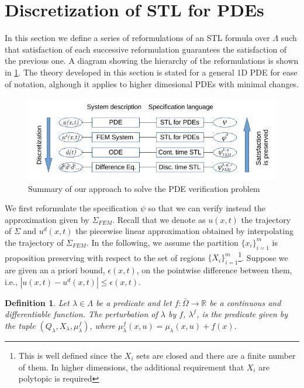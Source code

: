 \documentclass[letterpaper, 10 pt, conference]{ieeeconf/ieeeconf}
\newtheorem{definition}{Definition}
\newcommand*{\R}{\mathbb{R}}
\begin{document}
\section{Discretization of STL for PDEs}
\label{sec:formally_correct_discretization_of_pdestl}

In this section we define a series of reformulations of an STL formula over
$\Lambda$ such that satisfaction of each successive reformulation guarantees the
satisfaction of the previous one. A diagram showing the hierarchy of the
reformulations is shown in \cref{fig:diagram}. The theory developed in this section is stated
for a general 1D PDE for ease of notation, alghough it applies to higher dimesional PDEs
with minimal changes.

\begin{figure}[!t]
    \centering 
    \includegraphics[width=0.99\columnwidth]{diagram.png}
    \caption{Summary of our approach to solve the PDE verification problem }
    \label{fig:diagram}
\end{figure}


We first reformulate the specification $\psi$ so that we can verify instead the
approximation given by $\Sigma_{FEM}$. Recall that we denote as $u(x,t)$ the
trajectory of $\Sigma$ and $u^d(x, t)$ the piecewise linear approximation
obtained by interpolating the trajectory of $\Sigma_{FEM}$. In the following, we
assume the partition $\{x_i\}_{i=1}^m$ is proposition preserving with respect 
to the set of
regions $\{X_i\}_{i = 1}^{m}$\footnote{This is well defined since the $X_i$ sets are
closed and there are a finite number of them. In higher dimensions, the
additional requirement that $X_i$ are polytopic is required}. Suppose we are given
an a priori bound, $\epsilon(x, t)$, on the pointwise difference between them, i.e., 
$|u(x, t) - u^d(x, t)| \leq \epsilon(x, t)$.

\begin{definition}
\label{def:m_perturbation}
    Let $\lambda \in \Lambda$ be a predicate
    and let $f : \bar\Omega \to \R$ be a continuous and differentiable function. The perturbation of
    $\lambda$ by $f$, $\lambda^f$, is the predicate given by the tuple
    $(Q_\lambda, X_\lambda,
    \mu^f_\lambda)$, where $\mu^f_\lambda(x, u) = \mu_\lambda(x, u) + f(x)$.
\end{definition}
\end{document}
